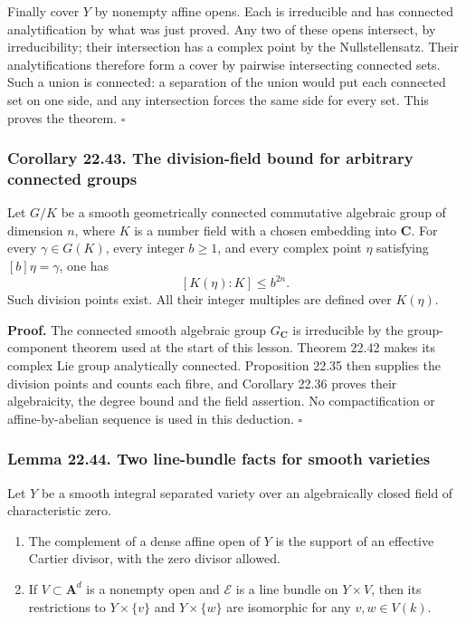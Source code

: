 \documentclass[
  11pt,
  a4paper,
]{article}
\newcounter{none} %
\providecommand{\tightlist}{%
  \setlength{\itemsep}{0pt}\setlength{\parskip}{0pt}}
\begin{document}
Finally cover \(Y\) by nonempty affine opens. Each is irreducible and
has connected analytification by what was just proved. Any two of these
opens intersect, by irreducibility; their intersection has a complex
point by the Nullstellensatz. Their analytifications therefore form a
cover by pairwise intersecting connected sets. Such a union is
connected: a separation of the union would put each connected set on one
side, and any intersection forces the same side for every set. This
proves the theorem. \(\square\)

\subsubsection{Corollary 22.43. The division-field bound for arbitrary
connected
groups}\label{corollary-22.43.-the-division-field-bound-for-arbitrary-connected-groups}

Let \(G/K\) be a smooth geometrically connected commutative algebraic
group of dimension \(n\), where \(K\) is a number field with a chosen
embedding into \(\mathbf C\). For every \(\gamma\in G(K)\), every
integer \(b\ge1\), and every complex point \(\eta\) satisfying
\([b]\eta=\gamma\), one has \[
 [K(\eta):K]\le b^{2n}.
 \tag{22.107}
\] Such division points exist. All their integer multiples are defined
over \(K(\eta)\).

\textbf{Proof.} The connected smooth algebraic group \(G_{\mathbf C}\)
is irreducible by the group-component theorem used at the start of this
lesson. Theorem 22.42 makes its complex Lie group analytically
connected. Proposition 22.35 then supplies the division points and
counts each fibre, and Corollary 22.36 proves their algebraicity, the
degree bound and the field assertion. No compactification or
affine-by-abelian sequence is used in this deduction. \(\square\)

\subsubsection{Lemma 22.44. Two line-bundle facts for smooth
varieties}\label{lemma-22.44.-two-line-bundle-facts-for-smooth-varieties}

Let \(Y\) be a smooth integral separated variety over an algebraically
closed field of characteristic zero.

\begin{enumerate}
\def\labelenumi{\arabic{enumi}.}
\tightlist
\item
  The complement of a dense affine open of \(Y\) is the support of an
  effective Cartier divisor, with the zero divisor allowed.
\item
  If \(V\subset\mathbf A^d\) is a nonempty open and \(\mathcal E\) is a
  line bundle on \(Y\times V\), then its restrictions to
  \(Y\times\{v\}\) and \(Y\times\{w\}\) are isomorphic for any
  \(v,w\in V(k)\).
\end{enumerate}
\end{document}
